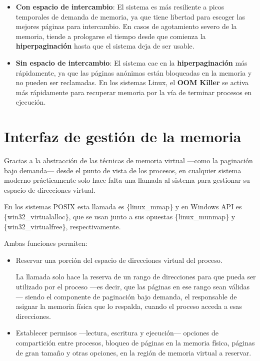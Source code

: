 \begin{itemize}
\item
  \textbf{Con espacio de intercambio}: El sistema es más resiliente a
  picos temporales de demanda de memoria, ya que tiene libertad para
  escoger las mejores páginas para intercambio. En casos de agotamiento
  severo de la memoria, tiende a prologarse el tiempo desde que comienza
  la \textbf{hiperpaginación} hasta que el sistema deja de ser usable.
\item
  \textbf{Sin espacio de intercambio}: El sistema cae en la
  \textbf{hiperpaginación} más rápidamente, ya que las páginas anónimas
  están bloqueadas en la memoria y no pueden ser reclamadas. En los
  sistemas Linux, el \textbf{OOM Killer} se activa más rápidamente para
  recuperar memoria por la vía de terminar procesos en ejecución.
\end{itemize}

\section{Interfaz de gestión de la
memoria}\label{_interfaz_de_gestiuxf3n_de_la_memoria}

Gracias a la abstracción de las técnicas de memoria virtual ---como la
paginación bajo demanda--- desde el punto de vista de los procesos, en
cualquier sistema moderno prácticamente solo hace falta una llamada al
sistema para gestionar su espacio de direcciones virtual.

En los sistemas POSIX esta llamada es \{linux\_mmap\} y en Windows API
es \{win32\_virtualalloc\}, que se usan junto a sus opuestas
\{linux\_munmap\} y \{win32\_virtualfree\}, respectivamente.

Ambas funciones permiten:

\begin{itemize}
\item
  Reservar una porción del espacio de direcciones virtual del proceso.

  La llamada solo hace la reserva de un rango de direcciones para que
  pueda ser utilizado por el proceso ---es decir, que las páginas en ese
  rango sean válidas--- siendo el componente de paginación bajo demanda,
  el responsable de asignar la memoria física que lo respalda, cuando el
  proceso acceda a esas direcciones.
\item
  Establecer permisos ---lectura, escritura y ejecución--- opciones de
  compartición entre procesos, bloqueo de páginas en la memoria física,
  páginas de gran tamaño y otras opciones, en la región de memoria
  virtual a reservar.
\end{itemize}

